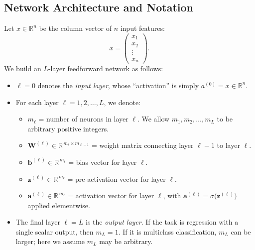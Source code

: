 \documentclass{article}
\begin{document}
\subsection{Network Architecture and Notation}\label{sec:n-inputs-layers-architecture}

\noindent Let \(x \in \mathbb{R}^n\) be the column vector of \(n\) input features:
\[
    x = \begin{pmatrix}x_{1}\\x_{2}\\\vdots\\x_{n}\end{pmatrix}.
\]
We build an \(L\)-layer feedforward network as follows:

\begin{itemize}
    \item \(\ell=0\) denotes the \emph{input layer}, whose “activation” is simply \(a^{(0)} = x \in \mathbb{R}^n\).
    \item For each layer \(\ell = 1,2,\dots,L\), we denote:
    \begin{itemize}
        \item \(m_{\ell}\) = number of neurons in layer \(\ell\).  
              We allow \(m_{1},m_{2},\dots,m_{L}\) to be arbitrary positive integers.  
        \item \(\mathbf{W}^{(\ell)} \in \mathbb{R}^{\,m_{\ell}\times m_{\ell-1}}\) = weight matrix connecting layer \(\ell-1\) to layer \(\ell\).  
        \item \(\mathbf{b}^{(\ell)} \in \mathbb{R}^{\,m_{\ell}}\) = bias vector for layer \(\ell\).  
        \item \(\mathbf{z}^{(\ell)} \in \mathbb{R}^{\,m_{\ell}}\) = pre-activation vector for layer \(\ell\).  
        \item \(\mathbf{a}^{(\ell)} \in \mathbb{R}^{\,m_{\ell}}\) = activation vector for layer \(\ell\), with \(\mathbf{a}^{(\ell)} = \sigma\bigl(\mathbf{z}^{(\ell)}\bigr)\) applied elementwise.
    \end{itemize}
    \item The final layer \(\ell = L\) is the \emph{output layer}. If the task is regression with a single scalar output, then \(m_{L} = 1\). If it is multiclass classification, \(m_{L}\) can be larger; here we assume \(m_{L}\) may be arbitrary.
\end{itemize}
\end{document}
